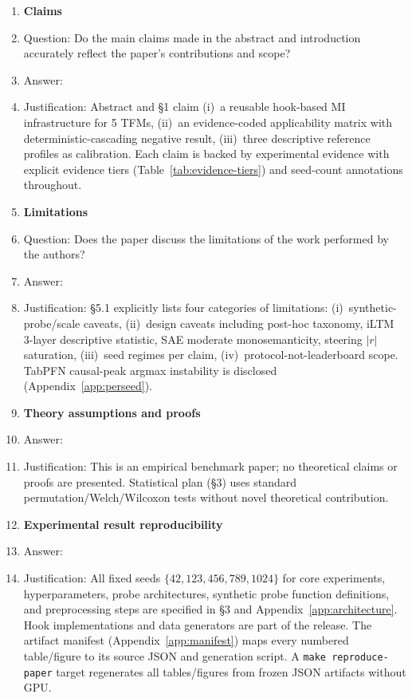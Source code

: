 \documentclass{article}
\begin{document}
\begin{enumerate}

\item {\bf Claims}
    \item[] Question: Do the main claims made in the abstract and introduction accurately reflect the paper's contributions and scope?
    \item[] Answer: \answerYes{}
    \item[] Justification: Abstract and \S1 claim (i)~a reusable hook-based MI infrastructure for 5 TFMs, (ii)~an evidence-coded applicability matrix with deterministic-cascading negative result, (iii)~three descriptive reference profiles as calibration. Each claim is backed by experimental evidence with explicit evidence tiers (Table~\ref{tab:evidence-tiers}) and seed-count annotations throughout.

\item {\bf Limitations}
    \item[] Question: Does the paper discuss the limitations of the work performed by the authors?
    \item[] Answer: \answerYes{}
    \item[] Justification: \S5.1 explicitly lists four categories of limitations: (i)~synthetic-probe/scale caveats, (ii)~design caveats including post-hoc taxonomy, iLTM 3-layer descriptive statistic, SAE moderate monosemanticity, steering $|r|$ saturation, (iii)~seed regimes per claim, (iv)~protocol-not-leaderboard scope. TabPFN causal-peak argmax instability is disclosed (Appendix~\ref{app:perseed}).

\item {\bf Theory assumptions and proofs}
    \item[] Answer: \answerNA{}
    \item[] Justification: This is an empirical benchmark paper; no theoretical claims or proofs are presented. Statistical plan (\S3) uses standard permutation/Welch/Wilcoxon tests without novel theoretical contribution.

\item {\bf Experimental result reproducibility}
    \item[] Answer: \answerYes{}
    \item[] Justification: All fixed seeds $\{42, 123, 456, 789, 1024\}$ for core experiments, hyperparameters, probe architectures, synthetic probe function definitions, and preprocessing steps are specified in \S3 and Appendix~\ref{app:architecture}. Hook implementations and data generators are part of the release. The artifact manifest (Appendix~\ref{app:manifest}) maps every numbered table/figure to its source JSON and generation script. A \texttt{make reproduce-paper} target regenerates all tables/figures from frozen JSON artifacts without GPU.


\end{enumerate}
\end{document}
